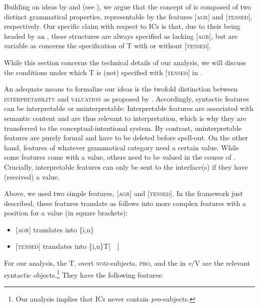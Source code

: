 \documentclass[output=paper,colorlinks,citecolor=brown,newtxmath]{langsci/langscibook}
\begin{document}
Building on ideas by \citet{Stowell1982,Stowell1995} and \citet{Wurmbrand2001} (see ), we argue that the concept of  is composed of two distinct grammatical properties, representable by the features [\textsc{agr}] and [\textsc{tensed}], respectively. Our specific claim with respect to  ICs is that, due to their being headed by an , these structures are always specified as lacking [\textsc{agr}], but are variable as concerns the specification of T with or without [\textsc{tensed}].

While this section concerns the technical details of our analysis, we will discuss the conditions under which T is (not) specified with [\textsc{tensed}] in .

An adequate means to formalize our ideas is the twofold distinction between \textsc{interpretability} and \textsc{valuation} as proposed by \citet{PesetskyTorrego2001}. Accordingly, syntactic features can be interpretable or uninterpretable: Interpretable features are associated with semantic content and are thus relevant to interpretation, which is why they are transferred to the conceptual-intentional system. By contrast, uninterpretable features are purely formal and have to be deleted before spell-out. On the other hand, features of whatever grammatical category need a certain value. While some features come with a value, others need to be valued in the course of . Crucially, interpretable features can only be sent to the interface(s) if they have (received) a value.

Above, we used two simple features, [\textsc{agr}] and [\textsc{tensed}]. In the framework just described, these features translate as follows into more complex features with a position for a value (in square brackets):

\begin{itemize}

\item {[}\textsc{agr}] translates into \{i,u\}\textPhi[~~]

\item {[}\textsc{tensed}] translates into \{i,u\}T[~~]

\end{itemize}

\noindent For our analysis, the  T, overt \textsc{nom}-subjects, \textsc{pro}, and the  in \textit{v}/V are the relevant syntactic objects.\footnote{Our analysis implies that  ICs never contain \textit{pro}-subjects.} They have the following features:
\end{document}
